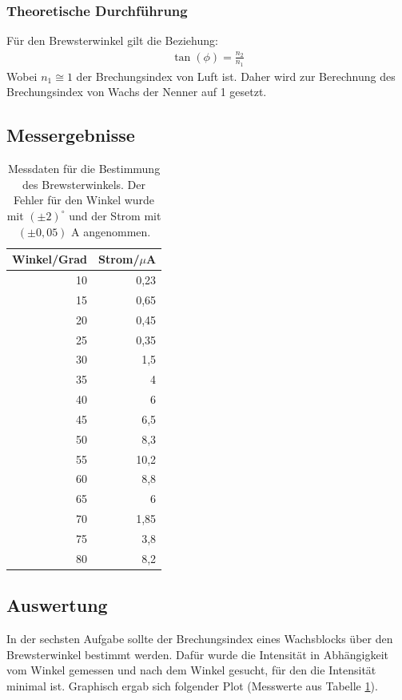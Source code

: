 \documentclass[12pt]{scrartcl}
\begin{document}
\subsubsection{Theoretische Durchführung}
Für den Brewsterwinkel gilt die Beziehung:
\begin{align}
\tan(\phi) = \frac{n_2}{n_1}
\label{eqn: Brewsterwinkel}
\end{align}
Wobei $n_1 \cong 1$ der Brechungsindex von Luft ist. Daher wird zur Berechnung des Brechungsindex von Wachs der Nenner auf 1 gesetzt.
\subsection{Messergebnisse}
\begin{table}[H]
\caption{Messdaten für die Bestimmung des Brewsterwinkels. Der Fehler für den Winkel wurde mit $(\pm 2)^{\circ}$ und der Strom mit $(\pm 0,05)$ A angenommen.}
\centering
\begin{tabular}{|r|r|}
\hline
\multicolumn{1}{|l|}{Winkel/Grad} & \multicolumn{1}{l|}{Strom/$\mu$A} \\ \hline
10 & 0,23 \\ \hline
15 & 0,65 \\ \hline
20 & 0,45 \\ \hline
25 & 0,35 \\ \hline
30 & 1,5 \\ \hline
35 & 4 \\ \hline
40 & 6 \\ \hline
45 & 6,5 \\ \hline
50 & 8,3 \\ \hline
55 & 10,2 \\ \hline
60 & 8,8 \\ \hline
65 & 6 \\ \hline
70 & 1,85 \\ \hline
75 & 3,8 \\ \hline
80 & 8,2 \\ \hline
\end{tabular}
\label{tab:a_6}
\end{table}
\subsection{Auswertung}
In der sechsten Aufgabe sollte der Brechungsindex eines Wachsblocks über den Brewsterwinkel bestimmt werden. Dafür wurde die Intensität in Abhängigkeit vom Winkel gemessen und nach dem Winkel gesucht, für den die Intensität minimal ist. Graphisch ergab sich folgender Plot (Messwerte aus Tabelle \ref{tab:a_6}).
\end{document}
